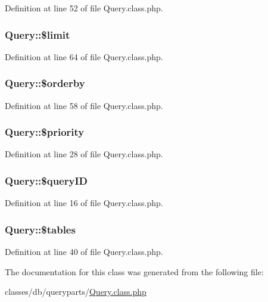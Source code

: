 Definition at line 52 of file Query.\+class.\+php.

\hypertarget{classQuery_abe481cf8b7f42b513a4f64cf7fb0ffea}{
\subsubsection[{\$limit}]{\setlength{\rightskip}{0pt plus 5cm}Query\+::\$limit}}\label{classQuery_abe481cf8b7f42b513a4f64cf7fb0ffea}


Definition at line 64 of file Query.\+class.\+php.

\hypertarget{classQuery_aa955216a83dfe57cdd9600b44b38ebac}{
\subsubsection[{\$orderby}]{\setlength{\rightskip}{0pt plus 5cm}Query\+::\$orderby}}\label{classQuery_aa955216a83dfe57cdd9600b44b38ebac}


Definition at line 58 of file Query.\+class.\+php.

\hypertarget{classQuery_a4d64f61fd525a70ebc2aaa6ab8291e20}{
\subsubsection[{\$priority}]{\setlength{\rightskip}{0pt plus 5cm}Query\+::\$priority}}\label{classQuery_a4d64f61fd525a70ebc2aaa6ab8291e20}


Definition at line 28 of file Query.\+class.\+php.

\hypertarget{classQuery_a67666b2fcd6c60e73d8329f7d22044dc}{
\subsubsection[{\$query\+I\+D}]{\setlength{\rightskip}{0pt plus 5cm}Query\+::\$query\+I\+D}}\label{classQuery_a67666b2fcd6c60e73d8329f7d22044dc}


Definition at line 16 of file Query.\+class.\+php.

\hypertarget{classQuery_a5c74163d1615b141456b123c11fa9d92}{
\subsubsection[{\$tables}]{\setlength{\rightskip}{0pt plus 5cm}Query\+::\$tables}}\label{classQuery_a5c74163d1615b141456b123c11fa9d92}


Definition at line 40 of file Query.\+class.\+php.



The documentation for this class was generated from the following file\+:\begin{DoxyCompactItemize}
\item 
classes/db/queryparts/\hyperlink{Query_8class_8php}{Query.\+class.\+php}\end{DoxyCompactItemize}
